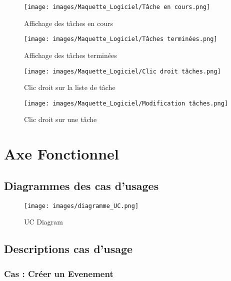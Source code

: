 \documentclass{article}
\begin{document}
\begin{figure}[H]
    \centering
    \texttt{[image: images/Maquette\_Logiciel/Tâche en cours.png]}
    \caption{Affichage des tâches en cours}
    \label{fig:29}
\end{figure}

\begin{figure}[H]
    \centering
    \texttt{[image: images/Maquette\_Logiciel/Tâches terminées.png]}
    \caption{Affichage des tâches terminées}
    \label{fig:30}
\end{figure}

\begin{figure}[H]
    \centering
    \texttt{[image: images/Maquette\_Logiciel/Clic droit tâches.png]}
    \caption{Clic droit sur la liste de tâche}
    \label{fig:31}
\end{figure}

\begin{figure}[H]
    \centering
    \texttt{[image: images/Maquette\_Logiciel/Modification tâches.png]}
    \caption{Clic droit sur une tâche}
    \label{fig:32}
\end{figure}

\newpage
\section{Axe Fonctionnel}

\subsection{Diagrammes des cas d'usages}

\begin{figure}[ht]
    \centering
    \texttt{[image: images/diagramme\_UC.png]}
    \caption{UC Diagram}
    \label{fig:1}
\end{figure}
\subsection{Descriptions cas d'usage}

\subsubsection{Cas : Créer un Evenement}
\end{document}
